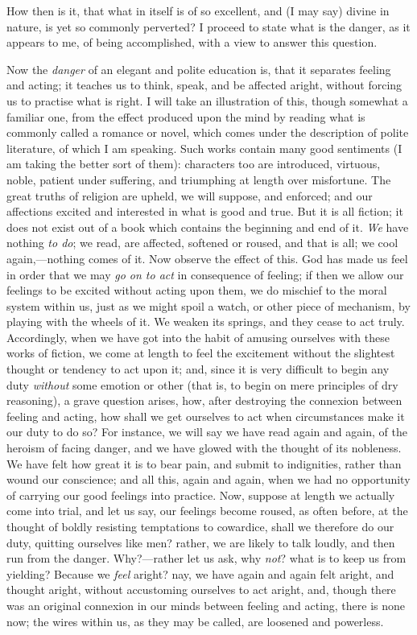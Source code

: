 How then is it, that what in itself is of so excellent, and (I may
say) divine in nature, is yet so commonly perverted? I proceed to state
what is the danger, as it appears to me, of being accomplished, with a
view to answer this question.

Now the \emph{danger} of an elegant and polite education is, that it
separates feeling and acting; it teaches us to think, speak, and be
affected aright, without forcing us to practise what is right. I will
take an illustration of this, though somewhat a familiar one, from the
effect produced upon the mind by reading what is commonly called a
romance or novel, which comes under the description of polite
literature, of which I am speaking. Such works contain many good
sentiments (I am taking the better sort of them): characters too are
introduced, virtuous, noble, patient under suffering, and triumphing at
length over misfortune. The great truths of religion are upheld, we will
suppose, and enforced; and our affections excited and interested in what
is good and true. But it is all fiction; it does not exist out of a book
which contains the beginning and end of it. \emph{We} have nothing \emph{to
do}; we read, are affected, softened or roused, and that is all; we
cool again,—nothing comes of it. Now observe the effect of this. God
has made us feel in order that we may \emph{go on to act} in consequence
of feeling; if then we allow our feelings to be excited without acting
upon them, we do mischief to the moral system within us, just as we
might spoil a watch, or other piece of mechanism, by playing with the
wheels of it. We weaken its springs, and they cease to act truly.
Accordingly, when we have got into the habit of amusing ourselves with
these works of fiction, we come at length to feel the excitement without
the slightest thought or tendency to act upon it; and, since it is very
difficult to begin any duty \emph{without} some emotion or other (that
is, to begin on mere principles of dry reasoning), a grave question
arises, how, after destroying the connexion between feeling and acting,
how shall we get ourselves to act when circumstances make it our duty to
do so? For instance, we will say we have read again and again, of the
heroism of facing danger, and we have glowed with the thought of its
nobleness. We have felt how great it is to bear pain, and submit to
indignities, rather than wound our conscience; and all this, again and
again, when we had no opportunity of carrying our good feelings into
practice. Now, suppose at length we actually come into trial, and let us
say, our feelings become roused, as often before, at the thought of
boldly resisting temptations to cowardice, shall we therefore do our
duty, quitting ourselves like men? rather, we are likely to talk loudly,
and then run from the danger. Why?—rather let us ask, why \emph{not}?
what is to keep us from yielding? Because we \emph{feel} aright? nay, we
have again and again felt aright, and thought aright, without
accustoming ourselves to act aright, and, though there was an original
connexion in our minds between feeling and acting, there is none now;
the wires within us, as they may be called, are loosened and powerless.

